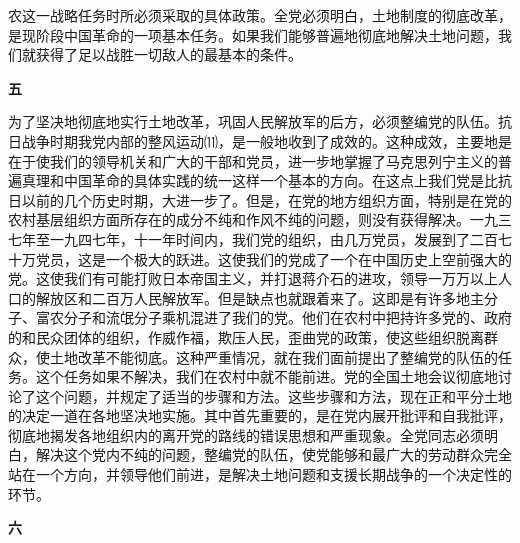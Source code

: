 \documentclass[UTF-8, a5paper, 12pt]{ctexart}
\begin{document}
农这一战略任务时所必须采取的具体政策。全党必须明白，土地制度的彻底改革，是现阶段中国革命的一项基本任务。如果我们能够普遍地彻底地解决土地问题，我们就获得了足以战胜一切敌人的最基本的条件。

\textbf{五}

为了坚决地彻底地实行土地改革，巩固人民解放军的后方，必须整编党的队伍。抗日战争时期我党内部的整风运动⑾，是一般地收到了成效的。这种成效，主要地是在于使我们的领导机关和广大的干部和党员，进一步地掌握了马克思列宁主义的普遍真理和中国革命的具体实践的统一这样一个基本的方向。在这点上我们党是比抗日以前的几个历史时期，大进一步了。但是，在党的地方组织方面，特别是在党的农村基层组织方面所存在的成分不纯和作风不纯的问题，则没有获得解决。一九三七年至一九四七年，十一年时间内，我们党的组织，由几万党员，发展到了二百七十万党员，这是一个极大的跃进。这使我们的党成了一个在中国历史上空前强大的党。这使我们有可能打败日本帝国主义，并打退蒋介石的进攻，领导一万万以上人口的解放区和二百万人民解放军。但是缺点也就跟着来了。这即是有许多地主分子、富农分子和流氓分子乘机混进了我们的党。他们在农村中把持许多党的、政府的和民众团体的组织，作威作福，欺压人民，歪曲党的政策，使这些组织脱离群众，使土地改革不能彻底。这种严重情况，就在我们面前提出了整编党的队伍的任务。这个任务如果不解决，我们在农村中就不能前进。党的全国土地会议彻底地讨论了这个问题，并规定了适当的步骤和方法。这些步骤和方法，现在正和平分土地的决定一道在各地坚决地实施。其中首先重要的，是在党内展开批评和自我批评，彻底地揭发各地组织内的离开党的路线的错误思想和严重现象。全党同志必须明白，解决这个党内不纯的问题，整编党的队伍，使党能够和最广大的劳动群众完全站在一个方向，并领导他们前进，是解决土地问题和支援长期战争的一个决定性的环节。

\textbf{六}
\end{document}
